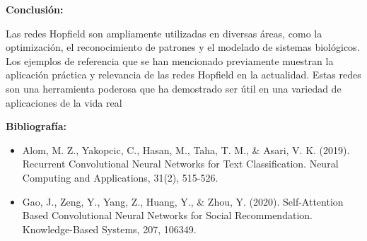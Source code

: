 \documentclass{article}
\begin{document}
\textbf{Conclusión:}

Las redes Hopfield son ampliamente utilizadas en diversas áreas, como la optimización, el reconocimiento de patrones y el modelado de sistemas biológicos. Los ejemplos de referencia que se han mencionado previamente muestran la aplicación práctica y relevancia de las redes Hopfield en la actualidad. Estas redes son una herramienta poderosa que ha demostrado ser útil en una variedad de aplicaciones de la vida real



\textbf{Bibliografía:}
\begin{itemize}
    \item Alom, M. Z., Yakopcic, C., Hasan, M., Taha, T. M., & Asari, V. K. (2019). Recurrent Convolutional Neural Networks for Text Classification. Neural Computing and Applications, 31(2), 515-526.
    \item Gao, J., Zeng, Y., Yang, Z., Huang, Y., & Zhou, Y. (2020). Self-Attention Based Convolutional Neural Networks for Social Recommendation. Knowledge-Based Systems, 207, 106349.
  
\end{itemize}
\end{document}
